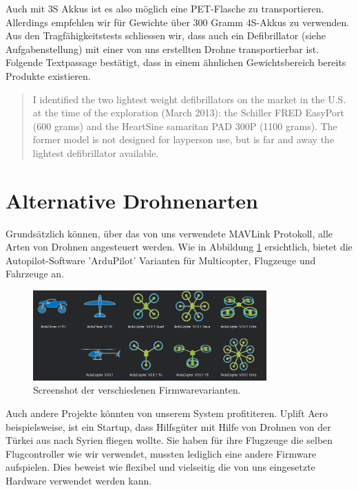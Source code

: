 Auch mit 3S Akkus ist es also möglich eine PET-Flasche zu transportieren. Allerdings empfehlen wir für Gewichte über 300 Gramm 4S-Akkus zu verwenden.\\

Aus den Tragfähigkeitstests schliessen wir, dass auch ein Defibrillator (siehe Aufgabenstellung) mit einer von uns erstellten Drohne transportierbar ist. Folgende Textpassage \cite[p.3]{FleckUAV} bestätigt, dass in einem ähnlichen Gewichtsbereich bereits Produkte existieren.

\blockquote{I identified the two lightest weight defibrillators on the market in the U.S. at the time of the exploration (March 2013): the Schiller FRED EasyPort (600 grams) and the HeartSine samaritan PAD 300P (1100 grams). The former model is not designed for layperson use, but is far and away the lightest defibrillator available.}

\newpage

\section{Alternative Drohnenarten}
\label{sec:drone-alternatives}

Grundsätzlich können, über das von uns verwendete \Gls{MAVLink} Protokoll, alle Arten von Drohnen angesteuert werden. Wie in Abbildung \ref{fig:arduScreenshot} ersichtlich, bietet die Autopilot-Software 'ArduPilot' Varianten für Multicopter, Flugzeuge und Fahrzeuge an.\\
\begin{figure}[H]
\centering
\includegraphics[width=0.8\textwidth] {images/arduScreenshot.jpg}
\caption{Screenshot der verschiedenen Firmwarevarianten.}
\label{fig:arduScreenshot}
\end{figure}

Auch andere Projekte könnten von unserem System profititeren. Uplift Aero beispielsweise, ist ein Startup, dass Hilfsgüter mit Hilfe von Drohnen von der Türkei aus nach Syrien fliegen wollte. Sie haben für ihre Flugzeuge die selben Flugcontroller wie wir verwendet, mussten lediglich eine andere Firmware aufspielen. Dies beweist wie flexibel und vielseitig die von uns eingesetzte Hardware verwendet werden kann.






